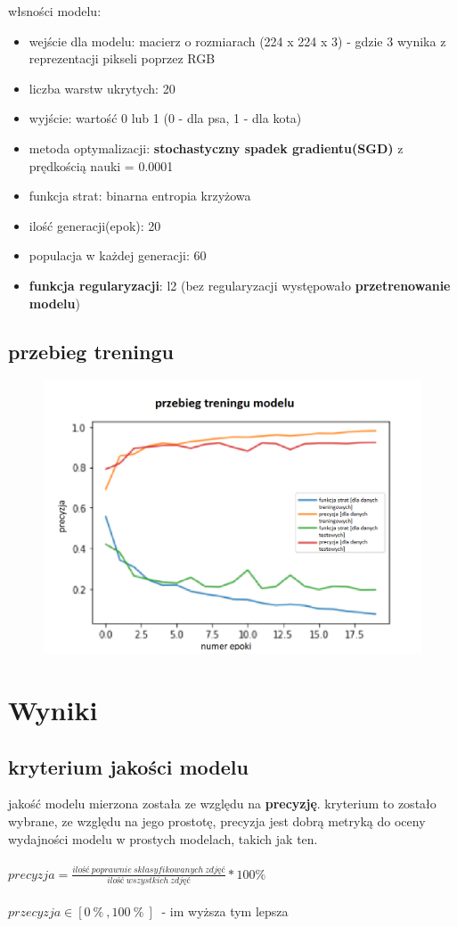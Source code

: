 \documentclass[a4paper,12pt]{scrartcl}
\begin{document}
włsności modelu:
\begin{itemize}
  \item wejście dla modelu: macierz o rozmiarach (224 x 224 x 3) - gdzie 3 wynika z reprezentacji pikseli poprzez RGB 
  \item liczba warstw ukrytych: 20 
  \item wyjście: wartość 0 lub 1 (0 - dla psa, 1 - dla kota) 
  \item metoda optymalizacji:  \textbf{stochastyczny spadek gradientu(SGD)} z prędkością nauki = 0.0001
  \item funkcja strat:  binarna entropia krzyżowa
  \item ilość generacji(epok):  20
  \item populacja w każdej generacji: 60
  \item \textbf{funkcja regularyzacji}: l2 (bez regularyzacji występowało \textbf{przetrenowanie modelu})
\end{itemize}  

\subsection{przebieg treningu}

\begin{figure}[h]
  \includegraphics[width=\linewidth]{TRENINNG.png}
\end{figure}
\newpage{}
\section{Wyniki}
\subsection{kryterium jakości modelu}
jakość modelu mierzona została ze względu na \textbf{precyzję}.
kryterium to zostało wybrane, ze względu na jego prostotę,
precyzja jest dobrą metryką do 
oceny wydajności modelu w prostych modelach, takich jak ten.\\\\
$precyzja = \frac{ilość\ poprawnie\ sklasyfikowanych\ zdjęć}{ilość\ wszystkich\ zdjęć} * 100 \% $\\\\
$przecyzja \in [0 \ \% \ , 100 \ \% \ ] \ $ - im wyższa tym lepsza
\end{document}
